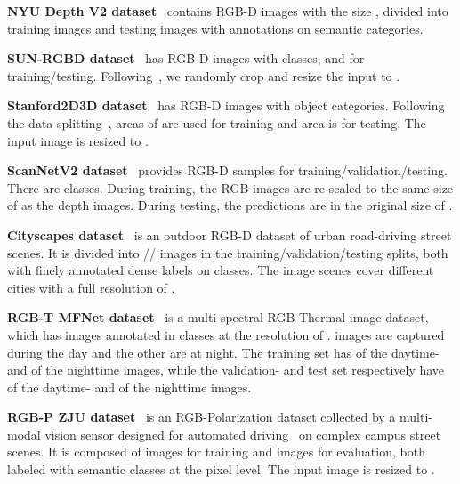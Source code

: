 \documentclass[journal]{IEEEtran}
\begin{document}
\noindent\textbf{NYU Depth V2 dataset}~\cite{silberman2012nyu_dataset} contains  RGB-D images with the size , divided into  training images and  testing images with annotations on  semantic categories.

\noindent\textbf{SUN-RGBD dataset}~\cite{song2015sun_rgbd} has  RGB-D images with  classes, and  for training/testing. Following~\cite{chen2020sa_gate,zhang2021non_aggregation}, we randomly crop and resize the input to .

\noindent\textbf{Stanford2D3D dataset}~\cite{armeni2017stanford2d3d} has  RGB-D images with  object categories. Following the data splitting~\cite{cao2021shapeconv,wang2018depth_aware}, areas of  are used for training and area  is for testing. The input image is resized to .

\noindent\textbf{ScanNetV2 dataset}~\cite{dai2017scannet} provides  RGB-D samples for training/validation/testing. There are  classes. During training, the RGB images are re-scaled to the same size of  as the depth images. During testing, the predictions are in the original size of .

\noindent\textbf{Cityscapes dataset}~\cite{cordts2016cityscapes} is an outdoor RGB-D dataset of urban road-driving street scenes. It is divided into // images in the training/validation/testing splits, both with finely annotated dense labels on  classes. The image scenes cover  different cities with a full resolution of .

\noindent\textbf{RGB-T MFNet dataset}~\cite{ha2017mfnet} is a multi-spectral RGB-Thermal image dataset, which has  images annotated in  classes at the resolution of .  images are captured during the day and the other  are at night. The training set has  of the daytime- and  of the nighttime images, while the validation- and test set respectively have  of the daytime- and  of the nighttime images.

\noindent\textbf{RGB-P ZJU dataset}~\cite{xiang2021polarization} is an RGB-Polarization dataset collected by a multi-modal vision sensor designed for automated driving~\cite{sun2019multimodal} on complex campus street scenes. It is composed of  images for training and  images for evaluation, both labeled with  semantic classes at the pixel level. The input image is resized to .
\end{document}
